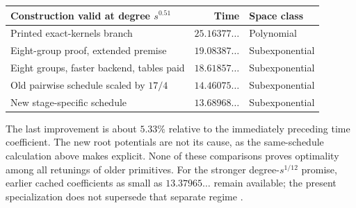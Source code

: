\begin{center}\small
\begin{tabular}{lrl}
\toprule Construction valid at degree $s^{0.51}$ & Time & Space class\\
\midrule
Printed exact-kernels branch & $25.16377\ldots$ & Polynomial\\
Eight-group proof, extended premise & $19.08387\ldots$ & Subexponential\\
Eight groups, faster backend, tables paid & $18.61857\ldots$ & Subexponential\\
Old pairwise schedule scaled by $17/4$ & $14.46075\ldots$ & Subexponential\\
New stage-specific schedule & $13.68968\ldots$ & Subexponential\\
\bottomrule
\end{tabular}
\end{center}
The last improvement is about $5.33\%$ relative to the immediately
preceding time coefficient. The new root potentials are not its cause,
as the same-schedule calculation above makes explicit. None of these
comparisons proves optimality among all retunings of older primitives.
For the stronger degree-$s^{1/12}$ promise, earlier cached coefficients
as small as $13.37965\ldots$ remain available; the present specialization
does not supersede that separate regime \cite{flags}.

